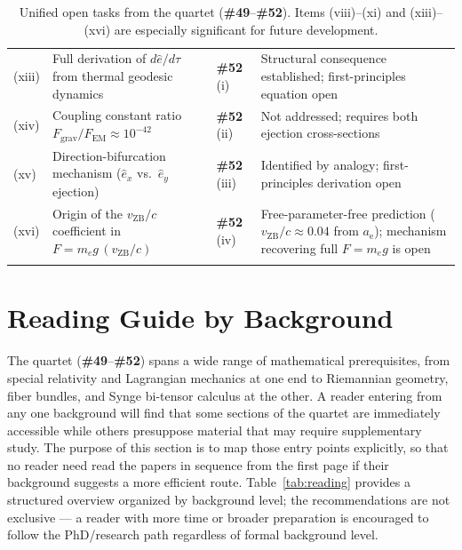 \documentclass[12pt,letterpaper]{article}
\newcommand{\paperno}[1]{\textbf{\#{}#1}}
\newcommand{\vZB}{v_{\mathrm{ZB}}}
\newcommand{\anom}{a_{\mathrm{e}}}
\newcommand{\ehat}[1]{\hat{e}_{#1}}
\begin{document}
\begin{longtable}{p{0.5cm}p{6.0cm}p{2.0cm}p{4.5cm}}
\addlinespace[0.3cm]
(xiii) & Full derivation of $d\hat{e}/d\tau$ from thermal geodesic dynamics &
  \paperno{52} (i) & Structural consequence established; first-principles equation open \\
\addlinespace[0.3cm]
(xiv) & Coupling constant ratio $F_{\mathrm{grav}}/F_{\mathrm{EM}}\approx10^{-42}$ &
  \paperno{52} (ii) & Not addressed; requires both ejection cross-sections \\
\addlinespace[0.3cm]
(xv) & Direction-bifurcation mechanism ($\ehat{x}$ vs.\ $\ehat{y}$ ejection) &
  \paperno{52} (iii) & Identified by analogy; first-principles derivation open \\
\addlinespace[0.3cm]
(xvi) & Origin of the $\vZB/c$ coefficient in $F = m_e g\,(\vZB/c)$ &
  \paperno{52} (iv) & Free-parameter-free prediction ($\vZB/c\approx 0.04$ from $\anom$); mechanism recovering full $F = m_e g$ is open \\
\addlinespace[0.2cm]
\bottomrule
\caption{Unified open tasks from the quartet (\paperno{49}--\paperno{52}). Items (viii)--(xi) and (xiii)--(xvi) are especially significant for future development.}
\label{tab:open}
\end{longtable}

\clearpage

\section{Reading Guide by Background}
\label{sec:reading}

The quartet (\paperno{49}--\paperno{52}) spans a wide range of mathematical prerequisites, from special relativity and Lagrangian mechanics at one end to Riemannian geometry, fiber bundles, and Synge bi-tensor calculus at the other. A reader entering from any one background will find that some sections of the quartet are immediately accessible while others presuppose material that may require supplementary study. The purpose of this section is to map those entry points explicitly, so that no reader need read the papers in sequence from the first page if their background suggests a more efficient route. Table~\ref{tab:reading} provides a structured overview organized by background level; the recommendations are not exclusive --- a reader with more time or broader preparation is encouraged to follow the PhD/research path regardless of formal background level.
\end{document}
